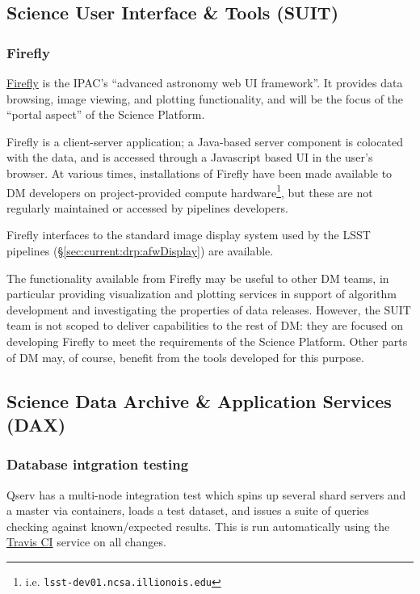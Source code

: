 \documentclass[DM,authoryear,toc,lsstdraft]{lsstdoc}
\begin{document}
\subsection{Science User Interface \& Tools (SUIT)}
\label{sec:current:suit}

\subsubsection{Firefly}
\label{sec:current:suit:firefly}

\href{https://github.com/Caltech-IPAC/firefly}{Firefly} is the IPAC's ``advanced
astronomy web UI framework''. It provides data browsing, image viewing, and
plotting functionality, and will be the focus of the ``portal aspect'' of the
Science Platform.

Firefly is a client-server application; a Java-based server component is
colocated with the data, and is accessed through a Javascript based UI in the
user's browser. At various times, installations of Firefly have been made
available to DM developers on project-provided compute hardware\footnote{i.e.
\texttt{lsst-dev01.ncsa.illionois.edu}}, but these are not regularly
maintained or accessed by pipelines developers.

Firefly interfaces to the standard image display system used by the LSST
pipelines (\S\ref{sec:current:drp:afwDisplay}) are available.

The functionality available from Firefly may be useful to other DM teams, in
particular providing visualization and plotting services in support of
algorithm development and investigating the properties of data releases.
However, the SUIT team is not scoped to deliver capabilities to the rest of
DM: they are focused on developing Firefly to meet the requirements of the
Science Platform. Other parts of DM may, of course, benefit from the tools
developed for this purpose.

\subsection{Science Data Archive \& Application Services (DAX)}
\label{sec:current:dax}

\subsubsection{Database intgration testing}
\label{sec:current:dax:dbint}

Qserv has a multi-node integration test which spins up several shard servers
and a master via containers, loads a test dataset, and issues a suite of
queries checking against known/expected results. This is run automatically
using the \href{https://travis-ci.org}{Travis CI} service on all changes.
\end{document}
